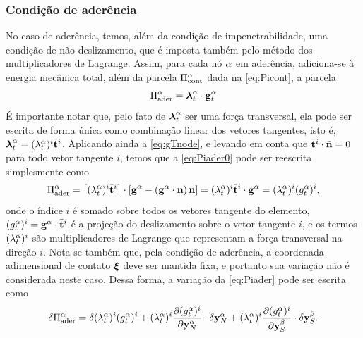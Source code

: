 \documentclass[Tese.tex]{subfiles}
\begin{document}
\subsubsection{Condição de aderência}

No caso de aderência, temos, além da condição de impenetrabilidade, uma condição de não-deslizamento, que é imposta também pelo método dos multiplicadores de Lagrange. Assim, para cada nó $\alpha$ em aderência, adiciona-se à energia mecânica total, além da parcela $\Pi_\text{cont}^\alpha$ dada na \cref{eq:Picont}, a parcela
\begin{equation}\label{eq:Piader0}
\Pi_\text{ader}^\alpha = \boldsymbol{\lambda}_t^\alpha\cdot\mathbf{g}_t^\alpha
\end{equation}
É importante notar que, pelo fato de $\boldsymbol{\lambda}_t^\alpha$ ser uma força transversal, ela pode ser escrita de forma única como combinação linear dos vetores tangentes, isto é, $\boldsymbol{\lambda}_t^\alpha = (\lambda_t^\alpha)^i\bar{\mathbf{t}}^i$. Aplicando ainda a \cref{eq:gTnode}, e levando em conta que $\bar{\mathbf{t}}^i\cdot\bar{\mathbf{n}} = 0$ para todo vetor tangente $i$, temos que a \cref{eq:Piader0} pode ser reescrita simplesmente como
\begin{equation}\label{eq:Piader}
\Pi_\text{ader}^\alpha = \left[(\lambda_t^\alpha)^i\bar{\mathbf{t}}^i\right]\cdot \left[\mathbf{g}^\alpha - \left(\mathbf{g}^\alpha\cdot\bar{\mathbf{n}}\right)\bar{\mathbf{n}}\right] = (\lambda_t^\alpha)^i\bar{\mathbf{t}}^i\cdot\mathbf{g}^\alpha = (\lambda_t^\alpha)^i(g_t^\alpha)^i,
\end{equation}
onde o índice $i$ é somado sobre todos os vetores tangente do elemento, $(g_t^\alpha)^i = \mathbf{g}^\alpha\cdot\bar{\mathbf{t}}^i$ é a projeção do deslizamento sobre o vetor tangente $i$, e os termos $(\lambda_t^\alpha)^i$ são multiplicadores de Lagrange que representam a força transversal na direção $i$. Nota-se também que, pela condição de aderência, a coordenada adimensional de contato $\boldsymbol{\xi}$ deve ser mantida fixa, e portanto sua variação não é considerada neste caso. Dessa forma, a variação da \cref{eq:Piader} pode ser escrita como
\begin{equation}\label{eq:deltaPiader}
\delta\Pi_\text{ader}^\alpha = \delta(\lambda_t^\alpha)^i(g_t^\alpha)^i + (\lambda_t^\alpha)^i\dfrac{\partial (g_t^\alpha)^i}{\partial \mathbf{y}_N^\alpha}\cdot \delta\mathbf{y}_N^\alpha + (\lambda_t^\alpha)^i\dfrac{\partial (g_t^\alpha)^i}{\partial \mathbf{y}_S^\beta}\cdot \delta\mathbf{y}_S^\beta.
\end{equation}
\end{document}
